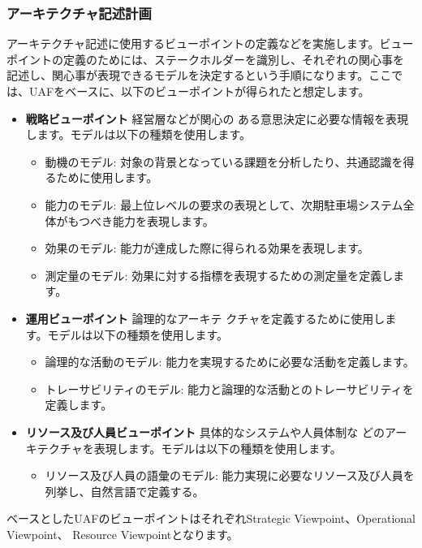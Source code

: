 \subsubsection{アーキテクチャ記述計画}
アーキテクチャ記述に使用するビューポイントの定義などを実施します。ビュー
ポイントの定義のためには、ステークホルダーを識別し、それぞれの関心事を
記述し、関心事が表現できるモデルを決定するという手順になります。ここで
は、UAFをベースに、以下のビューポイントが得られたと想定します。
\begin{itemize}
\item
  \textbf{戦略ビューポイント} 経営層などが関心の
  ある意思決定に必要な情報を表現します。モデルは以下の種類を使用します。
  \begin{itemize}
  \item
    動機のモデル: 対象の背景となっている課題を分析したり、共通認識を得
    るために使用します。
  \item
    能力のモデル: 最上位レベルの要求の表現として、次期駐車場システム全
    体がもつべき能力を表現します。
  \item
    効果のモデル: 能力が達成した際に得られる効果を表現します。
  \item
    測定量のモデル: 効果に対する指標を表現するための測定量を定義します。
  \end{itemize}
\item
  \textbf{運用ビューポイント} 論理的なアーキテ
  クチャを定義するために使用します。モデルは以下の種類を使用します。
  \begin{itemize}
  \item
    論理的な活動のモデル: 能力を実現するために必要な活動を定義します。
  \item
    トレーサビリティのモデル: 能力と論理的な活動とのトレーサビリティを
    定義します。
  \end{itemize}
\item
  \textbf{リソース及び人員ビューポイント} 具体的なシステムや人員体制な
  どのアーキテクチャを表現します。モデルは以下の種類を使用します。
  \begin{itemize}
  \item
    リソース及び人員の語彙のモデル: 能力実現に必要なリソース及び人員を
    列挙し、自然言語で定義する。
  \end{itemize}
\end{itemize}
ベースとしたUAFのビューポイントはそれぞれStrategic Viewpoint、Operational Viewpoint、
Resource Viewpointとなります。
